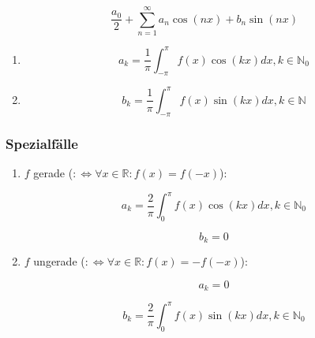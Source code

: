 \documentclass[twoside]{article}
\begin{document}
			\begin{displaymath}
				\frac{a_0}{2} + \sum_{n=1}^{\infty} a_n \cos(nx) + b_n \sin(nx)
			\end{displaymath}
			
			\begin{enumerate}[]
				
				\item 
					\begin{displaymath}
						a_k = \frac{1}{\pi} \int_{-\pi}^{\pi} f(x) \cos(kx) dx, k \in \mathbb{N}_0
					\end{displaymath}
			
				\item
					\begin{displaymath}
						b_k = \frac{1}{\pi} \int_{-\pi}^{\pi} f(x) \sin(kx) dx, k \in \mathbb{N}
					\end{displaymath}
			
			\end{enumerate}
			
			\subsubsection{Spezialfälle}
				
				\begin{enumerate}[]
				
					\item \begin{math} f \end{math} gerade (\begin{math} :\Leftrightarrow \forall x \in \mathbb{R}: f(x) = f(-x) \end{math}):
					
						\begin{displaymath}
							a_k = \frac{2}{\pi} \int_{0}^{\pi} f(x) \cos(kx) dx, k \in \mathbb{N}_0
						\end{displaymath}
					
						\begin{displaymath}
							b_k = 0
						\end{displaymath}
					
					\item \begin{math} f \end{math} ungerade (\begin{math} :\Leftrightarrow \forall x \in \mathbb{R}: f(x) = -f(-x) \end{math}):
					
						\begin{displaymath}
							a_k = 0
						\end{displaymath}
						
						\begin{displaymath}
							b_k = \frac{2}{\pi} \int_{0}^{\pi} f(x) \sin(kx) dx, k \in \mathbb{N}_0
						\end{displaymath}
						
									
				\end{enumerate}
	
\end{document}
